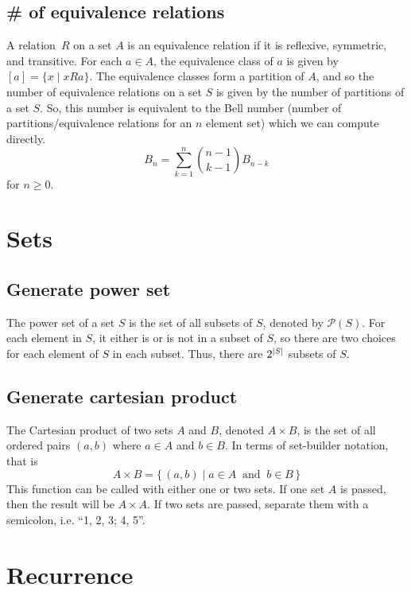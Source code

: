 \documentclass{article}
\begin{document}
\subsection{\# of equivalence relations}
A relation $R$ on a set $A$ is an equivalence relation if it is reflexive, symmetric, and transitive. For each $a \in A$, the equivalence class of $a$ is given by $[a] = \{x \mid xRa\}$. The equivalence classes form a partition of $A$, and so the number of equivalence relations on a set $S$ is given by the number of partitions of a set $S$. So, this number is equivalent to the Bell number (number of partitions/equivalence relations for an $n$ element set) which we can compute directly.
\[B_n = \sum_{k=1}^{n} {n-1 \choose k-1} B_{n-k}\]
for $n \ge 0$.

\newpage
\section{Sets}
\subsection{Generate power set}
The power set of a set $S$ is the set of all subsets of $S$, denoted by $\mathcal P(S)$. For each element in $S$, it either is or is not in a subset of $S$, so there are two choices for each element of $S$ in each subset. Thus, there are $2^{\,\abs{S}}$ subsets of $S$.
\subsection{Generate cartesian product}
The Cartesian product of two sets $A$ and $B$, denoted $A \times B$, is the set of all ordered pairs $(a, b)$ where $a \in A$ and $b \in B$. In terms of set-builder notation, that is
\[A\times B=\{\,(a,b)\mid a\in A\ {\mbox{ and }}\ b\in B\,\}\]
This function can be called with either one or two sets. If one set $A$ is passed, then the result will be $A \times A$. If two sets are passed, separate them with a semicolon, i.e. ``1, 2, 3; 4, 5''.

\section{Recurrence}
\end{document}

